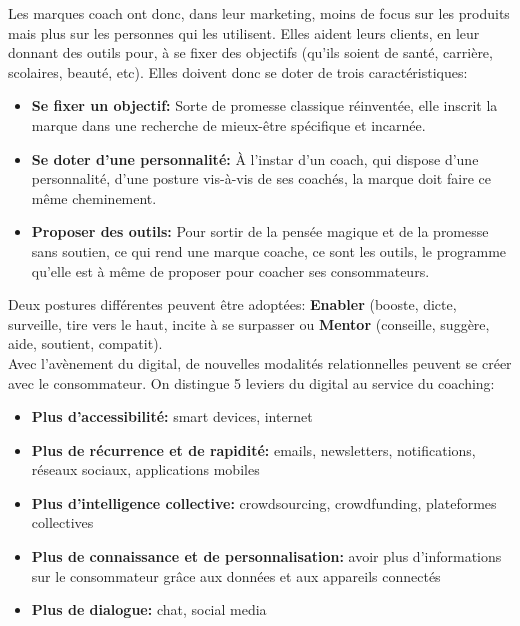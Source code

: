 Les marques coach ont donc, dans leur marketing, moins de focus sur les produits mais plus sur les personnes qui les utilisent. Elles aident leurs clients, en leur donnant des outils pour, à se fixer des objectifs (qu'ils soient de santé, carrière, scolaires, beauté, etc). Elles doivent donc se doter de trois caractéristiques:

\begin{itemize}
    \item \textbf{Se fixer un objectif:} Sorte de promesse classique réinventée, elle inscrit la marque dans une recherche de mieux-être spécifique et incarnée.
    \item \textbf{Se doter d'une personnalité:} À l'instar d'un coach, qui dispose d'une personnalité, d'une posture vis-à-vis de ses coachés, la marque doit faire ce même cheminement.
    \item \textbf{Proposer des outils:} Pour sortir de la pensée magique et de la promesse sans soutien, ce qui rend une marque coache, ce sont les outils, le programme qu'elle est à même de proposer pour coacher ses consommateurs.\\
\end{itemize}

Deux postures différentes peuvent être adoptées: \textbf{Enabler} (booste, dicte, surveille, tire vers le haut, incite à se surpasser ou \textbf{Mentor} (conseille, suggère, aide, soutient, compatit).\\

Avec l'avènement du digital, de nouvelles modalités relationnelles peuvent se créer avec le consommateur. On distingue 5 leviers du digital au service du coaching:

\begin{itemize}
    \item \textbf{Plus d'accessibilité:} smart devices, internet
    \item \textbf{Plus de récurrence et de rapidité:} emails, newsletters, notifications, réseaux sociaux, applications mobiles
    \item \textbf{Plus d'intelligence collective:} crowdsourcing, crowdfunding, plateformes collectives
    \item \textbf{Plus de connaissance et de personnalisation:} avoir plus d'informations sur le consommateur grâce aux données et aux appareils connectés
    \item \textbf{Plus de dialogue:} chat, social media \\
\end{itemize}

